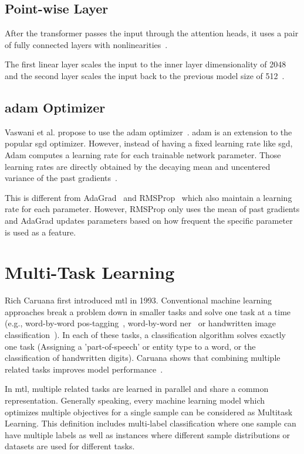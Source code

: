 \subsection{Point-wise Layer}

After the transformer passes the input through the attention heads, it uses a pair of fully connected layers with nonlinearities~\cite{Vaswani2017d}. 

The first linear layer scales the input to the inner layer dimensionality of 2048 and the second layer scales the input back to the previous model size of 512~\cite{Vaswani2017d}.

\subsection{\gls{adam} Optimizer}

Vaswani et al. propose to use the \acrfull{adam} optimizer~\cite{Kingma2014}. \gls{adam} is an extension to the popular \gls{sgd} optimizer. However, instead of having a fixed learning rate like \gls{sgd}, Adam computes a learning rate for each trainable network parameter. Those learning rates are directly obtained by the decaying mean and uncentered variance of the past gradients~\cite{Kingma2014}.
\medskip

This is different from AdaGrad~\cite{Duchi2011} and RMSProp~\cite{Hinton} which also maintain a learning rate for each parameter. However, RMSProp only uses the mean of past gradients and AdaGrad updates parameters based on how frequent the specific parameter is used as a feature.

\section{Multi-Task Learning}

Rich Caruana first introduced \acrfull{mtl} in 1993. Conventional machine learning approaches break a problem down in smaller tasks and solve one task at a time (e.g., word-by-word \gls{pos}-tagging~\cite{Toutanova2007}, word-by-word \gls{ner}~\cite{Sang2003} or handwritten image classification~\cite{LeCun;1990}). In each of these tasks, a classification algorithm solves exactly one task (Assigning a 'part-of-speech' or entity type to a word, or the classification of handwritten digits). Caruana shows that combining multiple related tasks improves model performance~\cite{Caruana1993, Caruana1997a}. 

In \gls{mtl}, multiple related tasks are learned in parallel and share a common representation. Generally speaking, every machine learning model which optimizes multiple objectives for a single sample can be considered as Multitask Learning. This definition includes multi-label classification where one sample can have multiple labels as well as instances where different sample distributions or datasets are used for different tasks.

